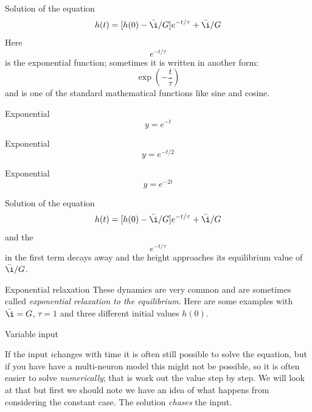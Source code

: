 \documentclass{beamer}
\newcommand{\crish}{\color{reddish}}
\newcommand{\cbla}{\color{black}}
\newcommand{\cblu}{\color{blue}}
\begin{document}
\begin{frame}{Solution of the equation}
  \crish{}
$$h(t)=[h(0)-\bar{\i}/G]\cblu{}e^{-t/\tau}\crish{}+\bar{\i}/G$$
\cbla{}Here\cblu
$$e^{-t/\tau}$$
\cbla{}is the \cblu{}exponential function\cbla{}; sometimes it is written in another form:
\cblu
$$\exp{\left(-\frac{t}{\tau}\right)}$$
\cbla{}and is one of the standard mathematical functions like sine and cosine.
\end{frame}

\begin{frame}{Exponential}
  \crish$$y=e^{-t}$$
  \begin{center}
    
  \end{center}
  \end{frame}


\begin{frame}{Exponential}
  \crish$$y=e^{-t/2}$$
  \begin{center}
    
  \end{center}
  \end{frame}


\begin{frame}{Exponential}
  \crish$$y=e^{-2t}$$
  \begin{center}
    
  \end{center}
  \end{frame}



\begin{frame}{Solution of the equation}
  \crish{}
$$h(t)=[h(0)-\bar{\i}/G]e^{-t/\tau}+\cblu{}\bar{\i}/G\crish{}$$
\cbla{}and the\cblu
$$e^{-t/\tau}$$
\cbla{}in the first term decays away and the height approaches its equilibrium value of \cblu$\bar{\i}/G$\crish.
\end{frame}

\begin{frame}{Exponential relaxation}
  These dynamics are very common and are sometimes called \textsl{exponential relaxation to the equilibrium}. Here are some examples with \crish$\bar{\i}=G$\cbla, \crish$\tau=1$\cbla{} and three different initial values \crish$h(0)$\cbla.
\begin{center}

\end{center}
\end{frame}


\begin{frame}{Variable input}

If the input \crish$i$\cbla changes with time it is often still
possible to solve the equation, but if you have have a multi-neuron
model this might not be possible, so it is often easier to solve
\textsl{numerically}; that is work out the value step by step. We will
look at that but first we should note we have an idea of what happens
from considering the constant case. The solution \textsl{chases} the
input.

\end{frame}
  
\end{document}
